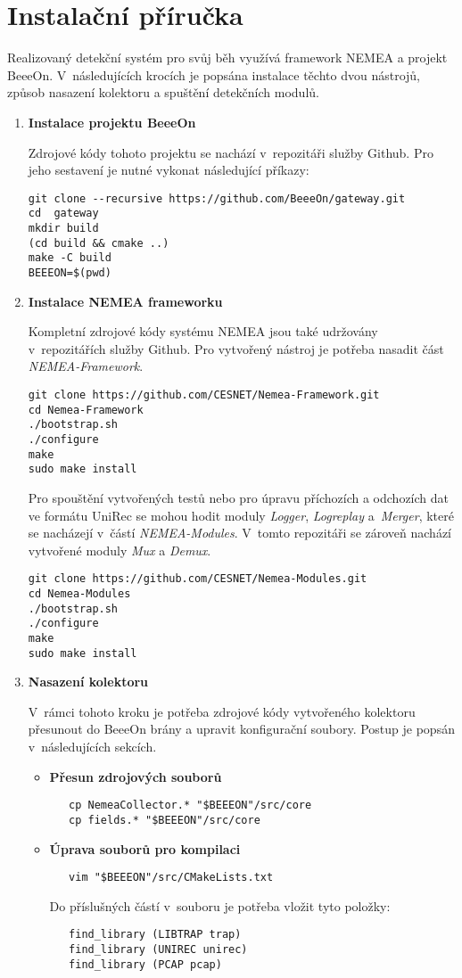 \documentclass[thesis=M,czech]{FITthesis}[2012/06/26]
\begin{document}
\chapter{Instalační příručka}
Realizovaný detekční systém pro svůj běh využívá framework NEMEA a projekt BeeeOn. V~následujících
krocích je popsána instalace těchto dvou nástrojů, způsob nasazení kolektoru a
spuštění detekčních modulů.

\begin{enumerate}
 \item \textbf{Instalace projektu BeeeOn}
 
 Zdrojové kódy tohoto projektu se nachází v~repozitáři služby Github. Pro jeho sestavení je nutné
 vykonat následující příkazy: 
\begin{verbatim}
git clone --recursive https://github.com/BeeeOn/gateway.git
cd  gateway
mkdir build
(cd build && cmake ..)
make -C build
BEEEON=$(pwd)
\end{verbatim}
 \item \textbf{Instalace NEMEA frameworku}
 
Kompletní zdrojové kódy systému NEMEA jsou také udržovány v~repozitářích služby Github. Pro
vytvořený nástroj je potřeba nasadit část \textit{NEMEA-Framework}.
\begin{verbatim}
git clone https://github.com/CESNET/Nemea-Framework.git
cd Nemea-Framework
./bootstrap.sh
./configure
make
sudo make install
\end{verbatim}

Pro spouštění vytvořených testů nebo pro úpravu příchozích a odchozích dat ve formátu UniRec se
mohou hodit moduly \textit{Logger}, \textit{Logreplay} a~\textit{Merger}, které se nacházejí
v~částí \textit{NEMEA-Modules}. V~tomto 
repozitáři se zároveň nachází vytvořené moduly \textit{Mux} a \textit{Demux}.
\begin{verbatim}
git clone https://github.com/CESNET/Nemea-Modules.git
cd Nemea-Modules
./bootstrap.sh
./configure
make
sudo make install
\end{verbatim}

\item \textbf{Nasazení kolektoru}

V~rámci tohoto kroku je potřeba zdrojové kódy vytvořeného kolektoru přesunout do BeeeOn brány
a upravit konfigurační soubory. Postup je popsán v~následujících sekcích.
\begin{itemize}
 \item \textbf{Přesun zdrojových souborů}
\begin{verbatim}
   cp NemeaCollector.* "$BEEEON"/src/core
   cp fields.* "$BEEEON"/src/core
\end{verbatim}
\item \textbf{Úprava souborů pro kompilaci}
\begin{verbatim}
   vim "$BEEEON"/src/CMakeLists.txt
\end{verbatim}
Do příslušných částí v~souboru je potřeba vložit tyto položky: 
\begin{verbatim}
   find_library (LIBTRAP trap)
   find_library (UNIREC unirec)
   find_library (PCAP pcap)


\end{verbatim}
\end{itemize}
\end{enumerate}
\end{document}
